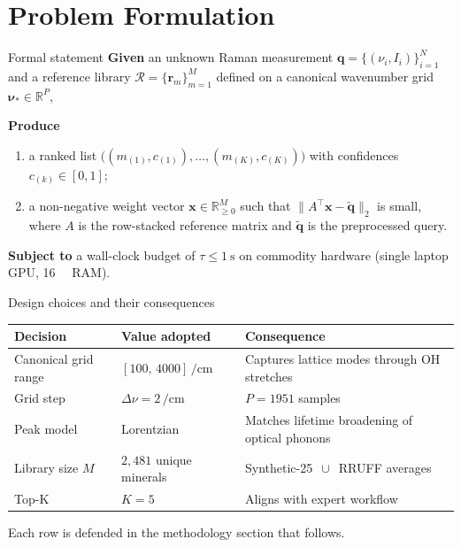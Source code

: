 \documentclass[10pt,aspectratio=169,xcolor=dvipsnames]{beamer}
\newcommand{\cmone}{\si{\per\centi\meter}}
\begin{document}
\section{Problem Formulation}

\begin{frame}{Formal statement}
  \textbf{Given} an unknown Raman measurement
  $\mathbf{q} = \{(\nu_i, I_i)\}_{i=1}^{N}$ and a reference library
  $\mathcal{R} = \{\mathbf{r}_m\}_{m=1}^{M}$ defined on a canonical
  wavenumber grid $\boldsymbol\nu_{*} \in \mathbb{R}^{P}$,
  \medskip

  \textbf{Produce}
  \begin{enumerate}
    \item a ranked list
          $\bigl((m_{(1)}, c_{(1)}),\ldots,(m_{(K)}, c_{(K)})\bigr)$
          with confidences $c_{(k)} \in [0,1]$;
    \item a non-negative weight vector
          $\mathbf{x} \in \mathbb{R}^{M}_{\geq 0}$ such that
          $\bigl\| A^\top\mathbf{x} - \tilde{\mathbf{q}} \bigr\|_{2}$ is small,
          where $A$ is the row-stacked reference matrix and
          $\tilde{\mathbf{q}}$ is the preprocessed query.
  \end{enumerate}
  \medskip

  \textbf{Subject to} a wall-clock budget of $\tau \leq \SI{1}{\second}$ on
  commodity hardware (single laptop GPU, \SI{16}{\giga\byte} RAM).
\end{frame}

\begin{frame}{Design choices and their consequences}
  \begin{table}\centering\small
    \begin{tabular}{@{}p{}p{}p{}@{}}
      \toprule
      \textbf{Decision} & \textbf{Value adopted} & \textbf{Consequence} \\
      \midrule
      Canonical grid range &
        $[100,\,4000]\,\cmone$ &
        Captures lattice modes through OH stretches \\
      Grid step &
        $\Delta\nu = 2\,\cmone$ &
        $P = 1951$ samples \\
      Peak model &
        Lorentzian &
        Matches lifetime broadening of optical phonons \\
      Library size $M$ &
        $2{,}481$ unique minerals &
        Synthetic-25 $\,\cup\,$ RRUFF averages \\
      Top-K &
        $K = 5$ &
        Aligns with expert workflow \\
      \bottomrule
    \end{tabular}
  \end{table}
  \medskip
  Each row is defended in the methodology section that follows.
\end{frame}
\end{document}
